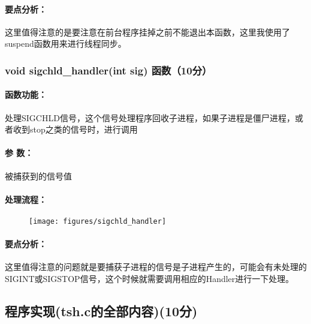 \paragraph{要点分析：}这里值得注意的是要注意在前台程序挂掉之前不能退出本函数，这里我使用了suspend函数用来进行线程同步。

\subsubsection{void sigchld\_handler(int sig) 函数（10分）}

\paragraph{函数功能：}处理SIGCHLD信号，这个信号处理程序回收子进程，如果子进程是僵尸进程，或者收到stop之类的信号时，进行调用
\paragraph{参   数：}被捕获到的信号值
\paragraph{处理流程：}
\begin{figure}[H]
    \centering 
    \texttt{[image: figures/sigchld\_handler]}
\end{figure}
\paragraph{要点分析：}这里值得注意的问题就是要捕获子进程的信号是子进程产生的，可能会有未处理的SIGINT或SIGSTOP信号，这个时候就需要调用相应的Handler进行一下处理。

\subsection{程序实现(tsh.c的全部内容)(10分)}
\inputminted{c}{../../../Experiment6/tsh.c}
